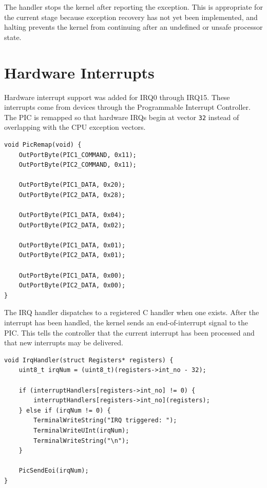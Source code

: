 The handler stops the kernel after reporting the exception. This is appropriate for the current stage because exception recovery has not yet been implemented, and halting prevents the kernel from continuing after an undefined or unsafe processor state.
\clearpage

\section{Hardware Interrupts}

Hardware interrupt support was added for IRQ0 through IRQ15. These interrupts come from devices through the Programmable Interrupt Controller. The PIC is remapped so that hardware IRQs begin at vector \texttt{32} instead of overlapping with the CPU exception vectors\cite{osdev8259Pic}.

\begin{listing}[H]
\begin{verbatim}
void PicRemap(void) {
    OutPortByte(PIC1_COMMAND, 0x11);
    OutPortByte(PIC2_COMMAND, 0x11);

    OutPortByte(PIC1_DATA, 0x20);
    OutPortByte(PIC2_DATA, 0x28);

    OutPortByte(PIC1_DATA, 0x04);
    OutPortByte(PIC2_DATA, 0x02);

    OutPortByte(PIC1_DATA, 0x01);
    OutPortByte(PIC2_DATA, 0x01);

    OutPortByte(PIC1_DATA, 0x00);
    OutPortByte(PIC2_DATA, 0x00);
}
\end{verbatim}
\caption{Remapping the PIC so IRQs use interrupt vectors \texttt{32} through \texttt{47}.}
\end{listing}

The IRQ handler dispatches to a registered C handler when one exists. After the interrupt has been handled, the kernel sends an end-of-interrupt signal to the PIC. This tells the controller that the current interrupt has been processed and that new interrupts may be delivered.

\begin{listing}[H]
\begin{verbatim}
void IrqHandler(struct Registers* registers) {
    uint8_t irqNum = (uint8_t)(registers->int_no - 32);

    if (interruptHandlers[registers->int_no] != 0) {
        interruptHandlers[registers->int_no](registers);
    } else if (irqNum != 0) {
        TerminalWriteString("IRQ triggered: ");
        TerminalWriteUInt(irqNum);
        TerminalWriteString("\n");
    }

    PicSendEoi(irqNum);
}
\end{verbatim}
\caption{Dispatching hardware interrupts and acknowledging them with the PIC.}
\end{listing}
\clearpage

